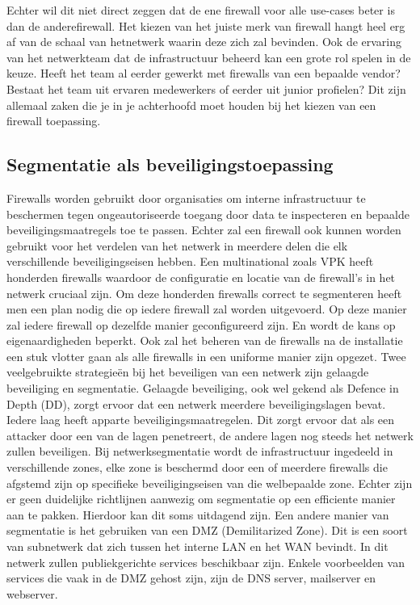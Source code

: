 Echter wil dit niet direct zeggen dat de ene firewall voor alle use-cases beter is dan de anderefirewall. Het kiezen van het juiste merk van firewall hangt heel erg af van de schaal van hetnetwerk waarin deze zich zal bevinden. Ook de ervaring van het netwerkteam dat de infrastructuur beheerd kan een grote rol spelen in de keuze. Heeft het team al eerder gewerkt met firewalls van een bepaalde vendor? Bestaat het team uit ervaren medewerkers of eerder uit junior profielen? Dit zijn allemaal zaken die je in je achterhoofd moet houden bij het kiezen van een firewall toepassing.



\subsection{Segmentatie als beveiligingstoepassing}
Firewalls worden gebruikt door organisaties om interne infrastructuur te beschermen tegen ongeautoriseerde toegang door data te inspecteren en bepaalde beveiligingsmaatregels toe te passen. Echter zal een firewall ook kunnen worden gebruikt voor het verdelen van het netwerk in meerdere delen die elk verschillende beveiligingseisen hebben. Een multinational zoals VPK heeft honderden firewalls waardoor de configuratie en locatie van de firewall’s in het netwerk cruciaal zijn. Om deze honderden firewalls correct te segmenteren heeft men een plan nodig die op iedere firewall zal worden uitgevoerd. Op deze manier zal iedere firewall op dezelfde manier geconfigureerd zijn. En wordt de kans op eigenaardigheden beperkt. Ook zal het beheren van de firewalls na de installatie een stuk vlotter gaan als alle firewalls in een uniforme manier zijn opgezet.
Twee veelgebruikte strategieën bij het beveiligen van een netwerk zijn gelaagde beveiliging en segmentatie. Gelaagde beveiliging, ook wel gekend als Defence in Depth (DD), zorgt ervoor dat een netwerk meerdere beveiligingslagen bevat. Iedere laag heeft apparte beveiligingsmaatregelen. Dit zorgt ervoor dat als een attacker door een van de lagen penetreert, de andere lagen nog steeds het netwerk zullen beveiligen. \autocite{FortinetDE2025} Bij netwerksegmentatie wordt de infrastructuur ingedeeld in verschillende zones, elke zone is beschermd door een of meerdere firewalls die afgstemd zijn op specifieke beveiligingseisen van die welbepaalde zone. Echter zijn er geen duidelijke richtlijnen aanwezig om segmentatie op een efficiente manier aan te pakken. Hierdoor kan dit soms uitdagend zijn. \autocite{Mhaskar2021}
Een andere manier van segmentatie is het gebruiken van een DMZ (Demilitarized Zone). Dit is een soort van subnetwerk dat zich tussen het interne LAN en het WAN bevindt. In dit netwerk zullen publiekgerichte services beschikbaar zijn. Enkele voorbeelden van services die vaak in de DMZ gehost zijn, zijn de DNS server, mailserver en webserver. \autocite{Patel2020}



